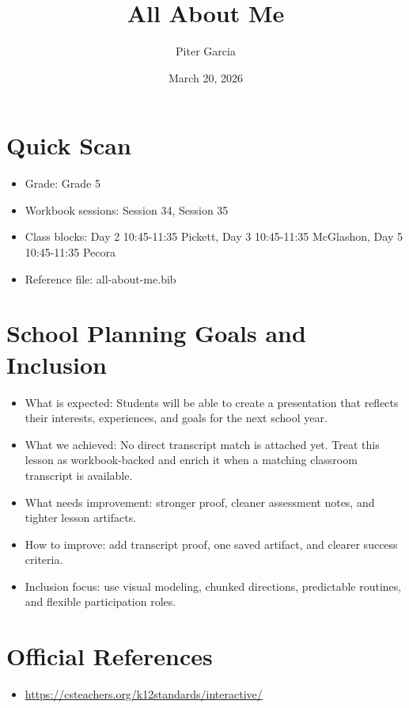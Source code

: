 \documentclass[11pt]{article}
\title{All About Me}
\author{Piter Garcia}
\date{March 20, 2026}
\begin{document}
\maketitle
\section*{Quick Scan}
\begin{itemize}[leftmargin=*]
\item Grade: Grade 5
\item Workbook sessions: Session 34, Session 35
\item Class blocks: Day 2 10:45-11:35 Pickett, Day 3 10:45-11:35 McGlashon, Day 5 10:45-11:35 Pecora
\item Reference file: all-about-me.bib
\end{itemize}
\section*{School Planning Goals and Inclusion}
\begin{itemize}[leftmargin=*]
\item What is expected: Students will be able to create a presentation that reflects their interests, experiences, and goals for the next school year.
\item What we achieved: No direct transcript match is attached yet. Treat this lesson as workbook-backed and enrich it when a matching classroom transcript is available.
\item What needs improvement: stronger proof, cleaner assessment notes, and tighter lesson artifacts.
\item How to improve: add transcript proof, one saved artifact, and clearer success criteria.
\item Inclusion focus: use visual modeling, chunked directions, predictable routines, and flexible participation roles.
\end{itemize}
\section*{Official References}
\begin{itemize}[leftmargin=*]
\item \url{https://csteachers.org/k12standards/interactive/}

\end{itemize}
\end{document}
